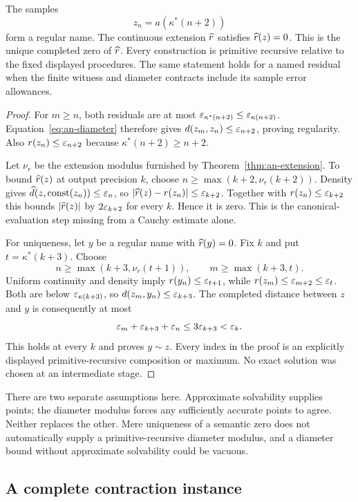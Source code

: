 \begin{theorem}
\label{thm:an-residual-recovery}
The samples
\[
 z_n=a(\kappa^*(n+2))
\]
form a regular name.  The continuous extension $\widehat r$ satisfies
$\widehat r(z)=0$.  This is the unique completed zero of $\widehat r$.
Every construction is primitive recursive relative to the fixed
displayed procedures.  The same statement holds for a named residual
when the finite witness and diameter contracts include its sample
error allowances.
\end{theorem}

\begin{proof}
For $m\ge n$, both residuals are at most
$\varepsilon_{\kappa^*(n+2)}\le\varepsilon_{\kappa(n+2)}$.
Equation~\eqref{eq:an-diameter} therefore gives
$d(z_m,z_n)\le\varepsilon_{n+2}$, proving regularity.
Also $r(z_n)\le\varepsilon_{n+2}$ because $\kappa^*(n+2)\ge n+2$.

Let $\nu_r$ be the extension modulus furnished by
Theorem~\ref{thm:an-extension}.  To bound $\widehat r(z)$ at output
precision $k$, choose
$n\ge\max(k+2,\nu_r(k+2))$.  Density gives
$\widehat d(z,\operatorname{const}(z_n))\le\varepsilon_n$, so
$|\widehat r(z)-r(z_n)|\le\varepsilon_{k+2}$.
Together with $r(z_n)\le\varepsilon_{k+2}$ this bounds
$|\widehat r(z)|$ by $2\varepsilon_{k+2}$ for every $k$.  Hence it is zero.
This is the canonical-evaluation step missing from a Cauchy estimate
alone.

For uniqueness, let $y$ be a regular name with $\widehat r(y)=0$.
Fix $k$ and put $t=\kappa^*(k+3)$.  Choose
\[
 n\ge\max(k+3,\nu_r(t+1)),\qquad
 m\ge\max(k+3,t).
\]
Uniform continuity and density imply
$r(y_n)\le\varepsilon_{t+1}$, while
$r(z_m)\le\varepsilon_{m+2}\le\varepsilon_t$.
Both are below $\varepsilon_{\kappa(k+3)}$, so
$d(z_m,y_n)\le\varepsilon_{k+3}$.
The completed distance between $z$ and $y$ is consequently at most
\[
 \varepsilon_m+\varepsilon_{k+3}+\varepsilon_n
 \le3\varepsilon_{k+3}<\varepsilon_k.
\]
This holds at every $k$ and proves $y\sim z$.  Every index in the
proof is an explicitly displayed primitive-recursive composition or
maximum.  No exact solution was chosen at an intermediate stage.
\end{proof}

There are two separate assumptions here.  Approximate solvability
supplies points; the diameter modulus forces any sufficiently accurate
points to agree.  Neither replaces the other.  Mere uniqueness of a
semantic zero does not automatically supply a primitive-recursive
diameter modulus, and a diameter bound without approximate solvability
could be vacuous.

\subsection{A complete contraction instance}

